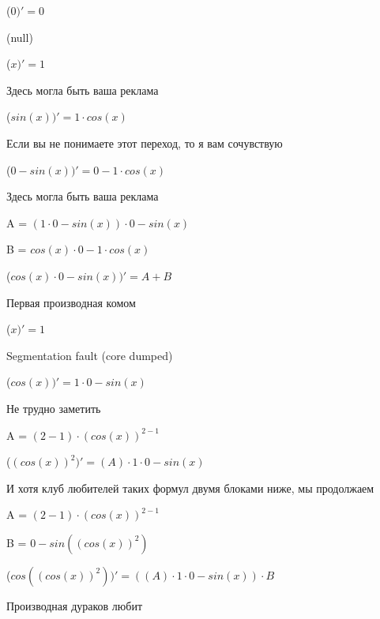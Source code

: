 \documentclass[12pt,a4paper,fleqn]{article}
\begin{document}
\begin{center}
 ($0)'
  = 0$\end{center}
(null)\cite{link4}

\begin{center}
 ($x)'
  = 1$\end{center}
Здесь могла быть ваша реклама

\begin{center}
 ($sin(x))'
  = 1 \cdot cos(x)$\end{center}
Если вы не понимаете этот переход, то я вам сочувствую

\begin{center}
 ($0-sin(x))'
  = 0-1 \cdot cos(x)$\end{center}
Здесь могла быть ваша реклама

\begin{center}
A = $(1 \cdot 0-sin(x)) \cdot 0-sin(x)$\end{center}
\begin{center}
B = $cos(x) \cdot 0-1 \cdot cos(x)$\end{center}
\begin{center}
 ($cos(x) \cdot 0-sin(x))'
  = A+B$\end{center}
Первая производная комом\cite{link2}

\begin{center}
 ($x)'
  = 1$\end{center}
Segmentation fault (core dumped)

\begin{center}
 ($cos(x))'
  = 1 \cdot 0-sin(x)$\end{center}
Не трудно заметить

\begin{center}
A = $(2-1) \cdot (cos(x))^{2-1}$\end{center}
\begin{center}
 ($(cos(x))^{2})'
  = (A) \cdot 1 \cdot 0-sin(x)$\end{center}
И хотя клуб любителей таких формул двумя блоками ниже, мы продолжаем

\begin{center}
A = $(2-1) \cdot (cos(x))^{2-1}$\end{center}
\begin{center}
B = $0-sin((cos(x))^{2})$\end{center}
\begin{center}
 ($cos((cos(x))^{2}))'
  = ((A) \cdot 1 \cdot 0-sin(x)) \cdot B$\end{center}
Производная дураков любит\cite{link2}
\end{document}
